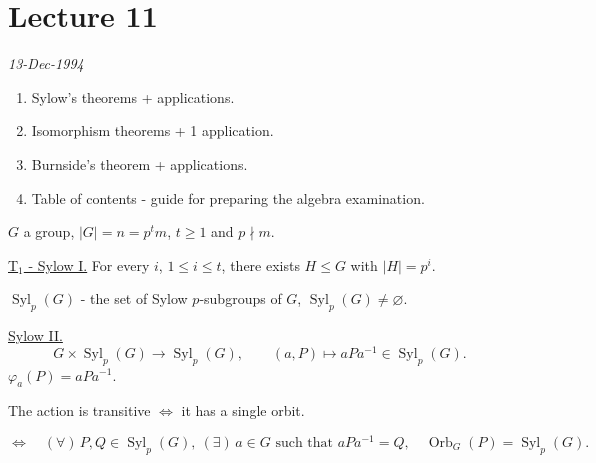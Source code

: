 
\clearpage
\section{Lecture 11}

\begin{center}
\end{center}
\begin{flushright}
\textit{13-Dec-1994}
\end{flushright}

\begin{enumerate}
    \item Sylow's theorems + applications.
    \item Isomorphism theorems + 1 application.
    \item Burnside's theorem + applications.
    \item Table of contents - guide for preparing the algebra examination.
\end{enumerate}

\medskip
\noindent $G$ a group, $|G|=n=p^t m$, $t\geq 1$ and $p\nmid m$.

\bigskip
\noindent\underline{T$_1$ - Sylow I.}\quad
For every $i$, $1\leq i\leq t$, there exists $H\leq G$ with $|H|=p^i$.

\medskip
\noindent $\operatorname{Syl}_p(G)$ - the set of Sylow $p$-subgroups of $G$,
$\operatorname{Syl}_p(G)\neq\varnothing$.

\bigskip
\noindent\underline{Sylow II.}
\[
G\times\operatorname{Syl}_p(G)\longrightarrow\operatorname{Syl}_p(G),
\qquad (a,P)\longmapsto aPa^{-1}\in\operatorname{Syl}_p(G).
\]
\noindent $\varphi_a(P)=aPa^{-1}$.

\medskip
\noindent The action is transitive $\Longleftrightarrow$ it has a single orbit.

\[
\Longleftrightarrow\quad
(\forall)\,P,Q\in\operatorname{Syl}_p(G),\ (\exists)\,a\in G
\text{ such that }aPa^{-1}=Q,
\quad \operatorname{Orb}_G(P)=\operatorname{Syl}_p(G).
\]

